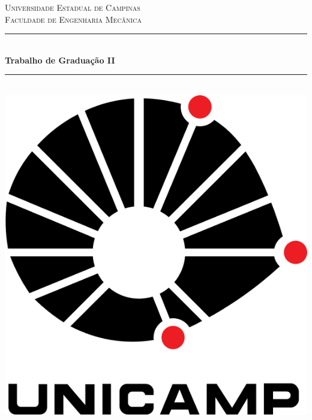 \documentclass[12pt]{article} %
\begin{document}

\begin{titlepage}

\newcommand{\HRule}{\rule{\linewidth}{0.5mm}} %

\center %

\textsc{\LARGE Universidade Estadual de Campinas}\\[1.5cm] %
\textsc{\Large Faculdade de Engenharia Mecânica}\\[0.5cm] %

\HRule \\[0.4cm]
{ \huge \bfseries Trabalho de Graduação II}\\[0.4cm] %
\HRule \\[1cm]

\includegraphics[scale=0.3]{pictures/unicamp.png}\\
\vspace{12mm}



\end{titlepage}
\end{document}
